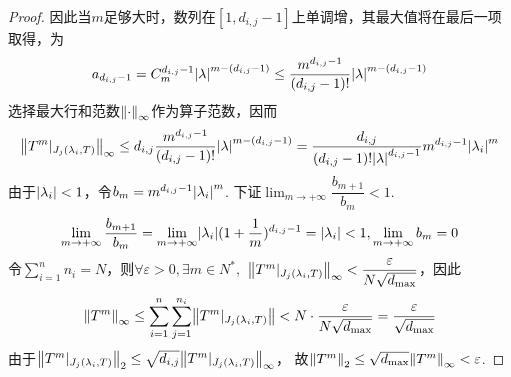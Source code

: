 \begin{proof}
    因此当\(m\)足够大时，数列在\([1,d_{i,j}-1]\)上单调增，其最大值将在最后一项取得，为
    \begin{align*}
        a_{d_{i,j}-1}=C_m^{d_{i,j}-1}\abs*{\lambda}^{m-(d_{i,j}-1)} \leq 
        \dfrac{m^{d_{i,j}-1}}{(d_{i,j}-1)!}\abs*{\lambda}^{m-(d_{i,j}-1)}
    \end{align*}
    选择最大行和范数\(\norm*{\cdot}_{\infty}\)作为算子范数，因而
    \begin{align*}
        \norm*{T^m|_{J_j(\lambda_i,T)}}_{\infty} \leq d_{i,j}\dfrac{m^{d_{i,j}-1}}{(d_{i,j}-1)!}\abs*{\lambda}^{m-(d_{i,j}-1)}
        =\dfrac{d_{i,j}}{(d_{i,j}-1)! \abs*{\lambda}^{d_{i,j}-1}}m^{d_{i,j}-1}\abs*{\lambda_i}^m
    \end{align*}
    由于\(\abs*{\lambda_i}<1\)，令\(b_m=m^{d_{i,j}-1}\abs*{\lambda_i}^m\).
    下证\(\lim_{m \rightarrow +\infty} \dfrac{b_{m+1}}{b_m}<1\).
    \begin{align*}
        \lim_{m \rightarrow +\infty} \dfrac{b_{m+1}}{b_m}
        =\lim_{m \rightarrow +\infty} \abs*{\lambda_i}(1+\dfrac{1}{m})^{d_{i,j}-1}=\abs*{\lambda_i}<1,
        \lim_{m \rightarrow +\infty} b_m=0
    \end{align*}
    令\(\sum_{i=1}^n n_i=N\)，则\(\forall \varepsilon>0,\exists m \in N^*,\)
    \(\norm*{T^m|_{J_j(\lambda_i,T)}}_{\infty}<\dfrac{\varepsilon}{N \sqrt{d_{\max}}}\)，因此
    \begin{align*}
        \norm*{T^m}_{\infty} \leq \sum_{i=1}^n \sum_{j=1}^{n_i}\norm*{T^m|_{J_j(\lambda_i,T)}}<
        N \cdot \dfrac{\varepsilon}{N \sqrt{d_{\max}}}=\dfrac{\varepsilon}{\sqrt{d_{\max}}}
    \end{align*}
    由于\(\norm*{T^m|_{J_j(\lambda_i,T)}}_2 \leq \sqrt{d_{i,j}}\norm*{T^m|_{J_j(\lambda_i,T)}}_{\infty}\)，
    故\(\norm*{T^m}_2 \leq \sqrt{d_{\max}}\norm*{T^m}_{\infty}<\varepsilon\).
\end{proof}

